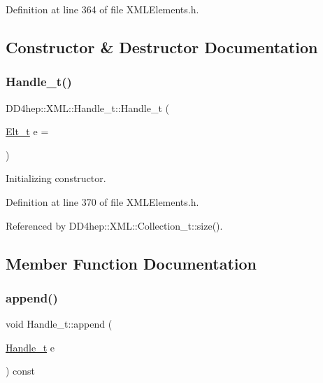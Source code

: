 Definition at line 364 of file X\+M\+L\+Elements.\+h.



\subsection{Constructor \& Destructor Documentation}
\hypertarget{class_d_d4hep_1_1_x_m_l_1_1_handle__t_a0fc9a01b5b31be8aff39ffc2b1f9e324}{}\label{class_d_d4hep_1_1_x_m_l_1_1_handle__t_a0fc9a01b5b31be8aff39ffc2b1f9e324} 
\subsubsection{\texorpdfstring{Handle\+\_\+t()}{Handle\_t()}}
{\footnotesize\ttfamily D\+D4hep\+::\+X\+M\+L\+::\+Handle\+\_\+t\+::\+Handle\+\_\+t (\begin{DoxyParamCaption}\item[{\hyperlink{class_d_d4hep_1_1_x_m_l_1_1_handle__t_a81a72155f29971b37652430a334a6b30}{Elt\+\_\+t}}]{e = {} }\end{DoxyParamCaption})\hspace{0.3cm}{\ttfamily [inline]}}



Initializing constructor. 



Definition at line 370 of file X\+M\+L\+Elements.\+h.



Referenced by D\+D4hep\+::\+X\+M\+L\+::\+Collection\+\_\+t\+::size().



\subsection{Member Function Documentation}
\hypertarget{class_d_d4hep_1_1_x_m_l_1_1_handle__t_a9e3099d5e30d43e198472eec78d84142}{}\label{class_d_d4hep_1_1_x_m_l_1_1_handle__t_a9e3099d5e30d43e198472eec78d84142} 
\subsubsection{\texorpdfstring{append()}{append()}}
{\footnotesize\ttfamily void Handle\+\_\+t\+::append (\begin{DoxyParamCaption}\item[{\hyperlink{class_d_d4hep_1_1_x_m_l_1_1_handle__t}{Handle\+\_\+t}}]{e }\end{DoxyParamCaption}) const}



